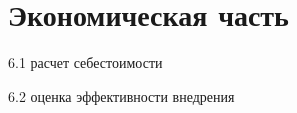 \section{Экономическая часть}

\begin{itemize*}
\item 6.1 расчет себестоимости
\item 6.2 оценка эффективности внедрения
\end{itemize*}
